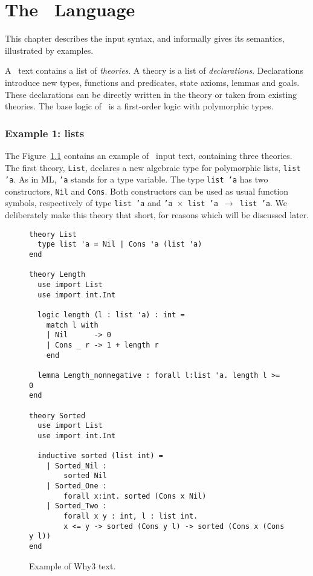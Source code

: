 \chapter{The \why\ Language}
\label{chap:syntax}

This chapter describes the input syntax, and informally gives its semantics,
illustrated by examples.

A \why\ text contains a list of \emph{theories}.
A theory is a list of \emph{declarations}. Declarations introduce new
types, functions and predicates, state axioms, lemmas and goals.
These declarations can be directly written in the theory or taken from
existing theories. The base logic of \why\ is a first-order
logic with polymorphic types.

\subsection{Example 1: lists}

The Figure~\ref{fig:tutorial1} contains an example of \why\ input
text, containing three theories. The first theory, \texttt{List},
declares a new algebraic type for polymorphic lists, \texttt{list 'a}.
As in ML, \texttt{'a} stands for a type variable.
The type \texttt{list 'a} has two constructors, \texttt{Nil} and
\texttt{Cons}. Both constructors can be used as usual function
symbols, respectively of type \texttt{list 'a} and \texttt{'a
  $\times$ list 'a $\rightarrow$ list 'a}.
We deliberately make this theory that short, for reasons which will be
discussed later.

\begin{figure}
\centering
\begin{verbatim}
theory List
  type list 'a = Nil | Cons 'a (list 'a)
end

theory Length
  use import List
  use import int.Int

  logic length (l : list 'a) : int =
    match l with
    | Nil      -> 0
    | Cons _ r -> 1 + length r
    end

  lemma Length_nonnegative : forall l:list 'a. length l >= 0
end

theory Sorted
  use import List
  use import int.Int

  inductive sorted (list int) =
    | Sorted_Nil :
        sorted Nil
    | Sorted_One :
        forall x:int. sorted (Cons x Nil)
    | Sorted_Two :
        forall x y : int, l : list int.
        x <= y -> sorted (Cons y l) -> sorted (Cons x (Cons y l))
end
\end{verbatim}
\caption{Example of Why3 text.}
\label{fig:tutorial1}
\end{figure}

